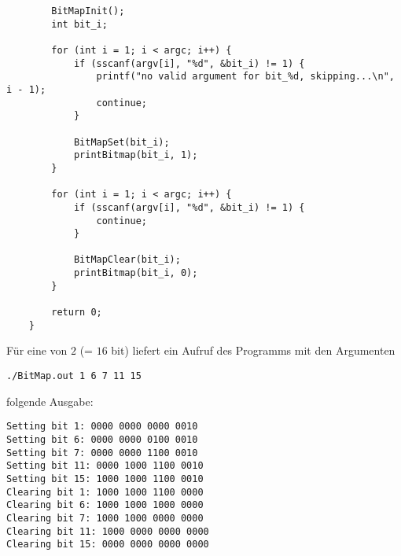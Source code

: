 \begin{verbatim}
        BitMapInit();
        int bit_i;

        for (int i = 1; i < argc; i++) {
            if (sscanf(argv[i], "%d", &bit_i) != 1) {
                printf("no valid argument for bit_%d, skipping...\n", i - 1);
                continue;
            }

            BitMapSet(bit_i);
            printBitmap(bit_i, 1);
        }

        for (int i = 1; i < argc; i++) {
            if (sscanf(argv[i], "%d", &bit_i) != 1) {
                continue;
            }

            BitMapClear(bit_i);
            printBitmap(bit_i, 0);
        }

        return 0;
    }

\end{verbatim}

\noindent
Für eine  von $2$ (= $16$ bit) liefert ein Aufruf des Programms mit den Argumenten
\begin{center}
    \texttt{./BitMap.out 1 6 7 11 15}
\end{center}

\noindent
folgende Ausgabe:

\begin{verbatim}
Setting bit 1: 0000 0000 0000 0010
Setting bit 6: 0000 0000 0100 0010
Setting bit 7: 0000 0000 1100 0010
Setting bit 11: 0000 1000 1100 0010
Setting bit 15: 1000 1000 1100 0010
Clearing bit 1: 1000 1000 1100 0000
Clearing bit 6: 1000 1000 1000 0000
Clearing bit 7: 1000 1000 0000 0000
Clearing bit 11: 1000 0000 0000 0000
Clearing bit 15: 0000 0000 0000 0000
\end{verbatim}